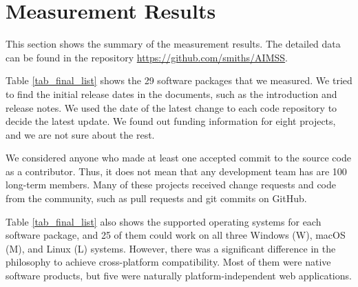 \chapter{Measurement Results}
\label{ch_results}

This section shows the summary of the measurement results. The detailed data can be found in the repository \hyperlink{https://github.com/smiths/AIMSS}{https://github.com/smiths/AIMSS}.

Table \ref{tab_final_list} shows the 29 software packages that we measured. We tried to find the initial release dates in the documents, such as the introduction and release notes. We used the date of the latest change to each code repository to decide the latest update. We found out funding information for eight projects, and we are not sure about the rest. 

We considered anyone who made at least one accepted commit to the source code as a contributor. Thus, it does not mean that any development team has are 100 long-term members. Many of these projects received change requests and code from the community, such as pull requests and git commits on GitHub.

Table \ref{tab_final_list} also shows the supported operating systems for each software package, and 25 of them could work on all three Windows (W), macOS (M), and Linux (L) systems. However, there was a significant difference in the philosophy to achieve cross-platform compatibility. Most of them were native software products, but five were naturally platform-independent web applications.

